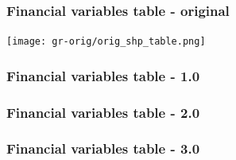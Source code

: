\documentclass[a4paper, notitlepage, fleqn]{article} %
\begin{document}
\newpage
\subsubsection{Financial variables table - original}

\begin{center}
\texttt{[image: gr-orig/orig\_shp\_table.png]} 
\end{center}

\newpage
\subsubsection{Financial variables table - 1.0}
\begin{stlog}\end{stlog}
\newpage
\begin{stlog}\end{stlog}
\newpage
\begin{stlog}\end{stlog}
\newpage
\subsubsection{Financial variables table - 2.0}
\begin{stlog}\end{stlog}
\newpage
\begin{stlog}\end{stlog}
\newpage
\begin{stlog}\end{stlog}
\newpage
\subsubsection{Financial variables table - 3.0}
\begin{stlog}\end{stlog}
\newpage
\begin{stlog}\end{stlog}
\newpage
\begin{stlog}\end{stlog}
\newpage
\end{document}

